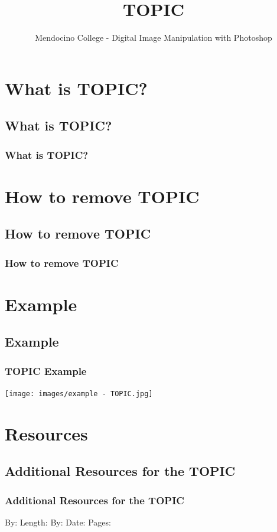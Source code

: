 \documentclass{beamer}
\title{TOPIC}
\author{Mendocino College - Digital Image Manipulation with Photoshop}
\date{\vspace{-5em}}
\begin{document}
	{
		\begin{frame}
			\vspace{-35pt}
			\maketitle
		\end{frame}
	}
		
		
\section{What is TOPIC?}

\subsection{What is TOPIC?}		

	\begin{frame}
		\frametitle{What is TOPIC?}
		\begin{outline}
			\1 
		\end{outline}
	\end{frame}

\section{How to remove TOPIC}
\subsection{How to remove TOPIC}
	\begin{frame}
	\frametitle{How to remove TOPIC}
	\begin{outline}
		\1 
	\end{outline}
\end{frame}

\section{Example}

\subsection{Example}		
	\begin{frame}
		\frametitle{TOPIC Example}
		\begin{center}
			\texttt{[image: images/example - TOPIC.jpg]}
		\end{center}
	\end{frame}

\section{Resources}
\subsection{Additional Resources for the TOPIC}		
	\begin{frame}
		\frametitle{Additional Resources for the TOPIC}
		\begin{outline}
			\1 
			\2  By:  
			\2  Length:
			\2 
			\1 
			\2  By:    
			\2  Date:  
			\2  Pages: 
			\2 
		\end{outline}
	\end{frame}

	
\end{document}
